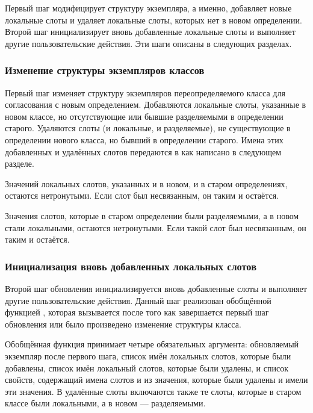 Первый шаг модифицирует структуру экземпляра, а именно, добавляет новые
локальные слоты и удаляет локальные слоты, которых нет в новом определении.
Второй шаг инициализирует вновь добавленные локальные слоты и выполняет другие
пользовательские действия. Эти шаги описаны в следующих разделах.

\subsubsection{Изменение структуры экземпляров классов}

Первый шаг изменяет структуру экземпляров переопределяемого класса для
согласования с новым определением. Добавляются локальные слоты, указанные в
новом классе, но отсутствующие или бывшие разделяемыми в определении
старого. Удаляются слоты (и локальные, и разделяемые), не существующие в
определении нового класса, но бывший в определении старого. Имена этих
добавленных и удалённых слотов передаются в
 как написано в следующем разделе.

Значений локальных слотов, указанных и в новом, и в старом определениях,
остаются нетронутыми. Если слот был несвязанным, он таким и остаётся.

Значения слотов, которые в старом определении были разделяемыми, а в новом стали
локальными, остаются нетронутыми. Если такой слот был несвязанным, он таким и
остаётся.

\subsubsection{Инициализация вновь добавленных локальных слотов}
 
Второй шаг обновления инициализируется вновь добавленные слоты и выполняет
другие пользовательские действия. Данный шаг реализован обобщённой функцией 
, которая вызывается после того как
завершается первый шаг обновления или было произведено изменение структуры
класса.

Обобщённая функция  принимает четыре
обязательных аргумента: обновляемый экземпляр после первого шага, список имён
локальных слотов, которые были добавлены, список имён локальный слотов, которые
были удалены, и список свойств, содержащий имена слотов и из значения, которые
были удалены и имели эти значения. В удалённые слоты включаются также те слоты,
которые в старом классе были локальными, а в новом --- разделяемыми.

